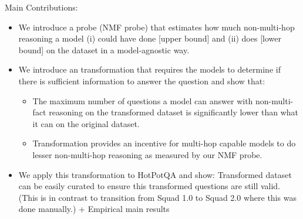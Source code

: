 Main Contributions:

\begin{itemize}
    \item We introduce a probe (NMF probe) that estimates how much non-multi-hop reasoning a model (i) could have done [upper bound] and (ii) does [lower bound] on the dataset in a model-agnostic way.
    \item We introduce an transformation that requires the models to determine if there is sufficient information to answer the question and show that:
    \begin{itemize}
        \item The maximum number of questions a model can answer with non-multi-fact reasoning on the transformed dataset is significantly lower than what it can on the original dataset.
        \item Transformation provides an incentive for multi-hop capable models to do lesser non-multi-hop reasoning as measured by our NMF probe.
    \end{itemize}
    \item We apply this transformation to HotPotQA and show: Transformed dataset can be easily curated to ensure this transformed questions are still valid. (This is in contrast to transition from Squad 1.0 to Squad 2.0 where this was done manually.) + Empirical main results
\end{itemize}

